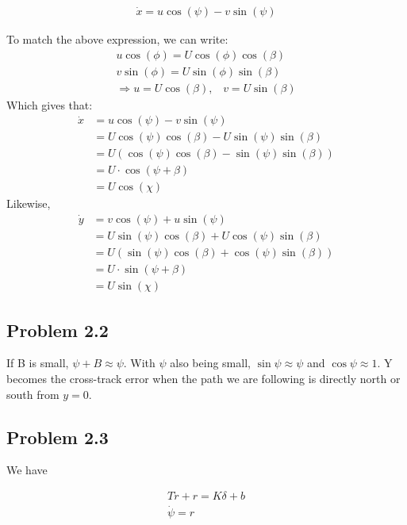\begin{align}
    \dot{x}  = u\cos(\psi) - v\sin(\psi)
\end{align}

To match the above expression, we can write: \\
\begin{align}
    u\cos(\phi) = U\cos(\phi)\cos(\beta) \\
    v\sin(\phi) = U\sin(\phi)\sin(\beta) \\
    \Rightarrow u = U\cos(\beta) \text{,} \quad v=U\sin(\beta)
\end{align}
Which gives that: 
\begin{align}
\dot{x}  &= u\cos(\psi) - v\sin(\psi) \\
    &= U\cos(\psi)\cos(\beta) - U\sin(\psi)\sin(\beta) \\
    &= U(\cos(\psi)\cos(\beta) - \sin(\psi)\sin(\beta)) \\
    &= U\cdot \cos(\psi + \beta)  \\
    &= U\cos(\chi) 
\end{align}
Likewise,
\begin{align}
    \dot{y} &=  v\cos(\psi) + u\sin(\psi) \\
    &= U\sin(\psi)\cos(\beta) + U\cos(\psi)\sin(\beta) \\
    &= U(\sin(\psi)\cos(\beta) + \cos(\psi)\sin(\beta)) \\
    &= U\cdot \sin(\psi + \beta)  \\
    &= U\sin(\chi) 
\end{align}

\subsection*{Problem 2.2}

If B is small, $\psi + B \approx \psi$. With $\psi$ also being small, $\sin{\psi} \approx \psi$ and $\cos{\psi} \approx 1$. Y becomes the cross-track error when the path we are following is directly north or south from $y=0$. 

\subsection*{Problem 2.3}

We have 

\begin{align}
    T\dot{r} + r = K\delta + b \\
    \dot{\psi} = r \\
\end{align}

